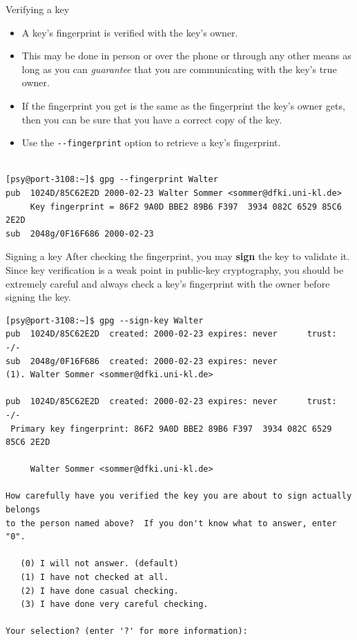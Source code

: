 \documentclass[%
mode=present,%
paper=screen%
]{powerdot}
\newcommand{\clopt}[1]{\texttt{{-}#1}}
\begin{document}
\begin{slide}[method=direct]{Verifying a key}
  \begin{itemize}
  \item A key's fingerprint is verified with the key's owner.
  \item This may be done in person or over the phone or through any
    other means as long as you can \emph{guarantee} that you are
    communicating with the key's true owner.
  \item If the fingerprint you get is the same as the fingerprint the
    key's owner gets, then you can be sure that you have a correct
    copy of the key.
  \item Use the \clopt{-fingerprint} option to retrieve a key's
    fingerprint.
  \end{itemize}

\begin{verbatim}

[psy@port-3108:~]$ gpg --fingerprint Walter
pub  1024D/85C62E2D 2000-02-23 Walter Sommer <sommer@dfki.uni-kl.de>
     Key fingerprint = 86F2 9A0D BBE2 89B6 F397  3934 082C 6529 85C6 2E2D
sub  2048g/0F16F686 2000-02-23
\end{verbatim}%
\end{slide}

\makeatletter\renewcommand{\verbatim@font}{\tiny\tt}\makeatother
\begin{slide}[method=direct]{Signing a key}
  After checking the fingerprint, you may \textbf{sign} the key to
  validate it.  Since key verification is a weak point in public-key
  cryptography, you should be extremely careful and always check a
  key's fingerprint with the owner before signing the key.\\[1ex]
\begin{verbatim}
[psy@port-3108:~]$ gpg --sign-key Walter
pub  1024D/85C62E2D  created: 2000-02-23 expires: never      trust: -/-
sub  2048g/0F16F686  created: 2000-02-23 expires: never
(1). Walter Sommer <sommer@dfki.uni-kl.de>

pub  1024D/85C62E2D  created: 2000-02-23 expires: never      trust: -/-
 Primary key fingerprint: 86F2 9A0D BBE2 89B6 F397  3934 082C 6529 85C6 2E2D

     Walter Sommer <sommer@dfki.uni-kl.de>

How carefully have you verified the key you are about to sign actually belongs
to the person named above?  If you don't know what to answer, enter "0".

   (0) I will not answer. (default)
   (1) I have not checked at all.
   (2) I have done casual checking.
   (3) I have done very careful checking.

Your selection? (enter '?' for more information):
\end{verbatim}%
\end{slide}
\end{document}
